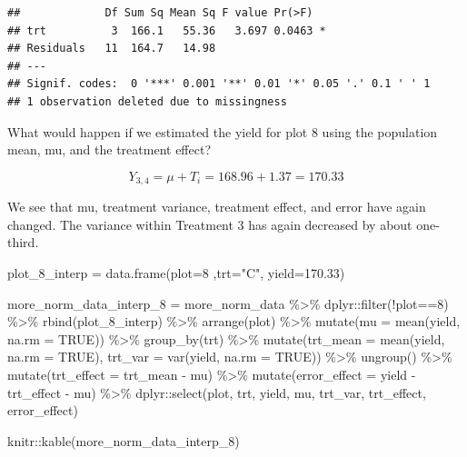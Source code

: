 \documentclass[
]{book}
\newenvironment{Shaded}{\begin{snugshade}}{\end{snugshade}}
\newcommand{\AttributeTok}[1]{\textcolor[rgb]{0.77,0.63,0.00}{#1}}
\newcommand{\ConstantTok}[1]{\textcolor[rgb]{0.00,0.00,0.00}{#1}}
\newcommand{\DecValTok}[1]{\textcolor[rgb]{0.00,0.00,0.81}{#1}}
\newcommand{\FloatTok}[1]{\textcolor[rgb]{0.00,0.00,0.81}{#1}}
\newcommand{\FunctionTok}[1]{\textcolor[rgb]{0.00,0.00,0.00}{#1}}
\newcommand{\NormalTok}[1]{#1}
\newcommand{\OtherTok}[1]{\textcolor[rgb]{0.56,0.35,0.01}{#1}}
\newcommand{\SpecialCharTok}[1]{\textcolor[rgb]{0.00,0.00,0.00}{#1}}
\newcommand{\StringTok}[1]{\textcolor[rgb]{0.31,0.60,0.02}{#1}}
\begin{document}
\begin{verbatim}
##             Df Sum Sq Mean Sq F value Pr(>F)  
## trt          3  166.1   55.36   3.697 0.0463 *
## Residuals   11  164.7   14.98                 
## ---
## Signif. codes:  0 '***' 0.001 '**' 0.01 '*' 0.05 '.' 0.1 ' ' 1
## 1 observation deleted due to missingness
\end{verbatim}

What would happen if we estimated the yield for plot 8 using the population mean, mu, and the treatment effect?

\[ Y_{3,4} = \mu + T_i = 168.96 + 1.37 = 170.33 \]

We see that mu, treatment variance, treatment effect, and error have again changed. The variance within Treatment 3 has again decreased by about one-third.

\begin{Shaded}
\begin{Highlighting}[]
\NormalTok{plot\_8\_interp }\OtherTok{=} \FunctionTok{data.frame}\NormalTok{(}\AttributeTok{plot=}\DecValTok{8}\NormalTok{ ,}\AttributeTok{trt=}\StringTok{"C"}\NormalTok{, }\AttributeTok{yield=}\FloatTok{170.33}\NormalTok{)}

\NormalTok{more\_norm\_data\_interp\_8 }\OtherTok{=}\NormalTok{ more\_norm\_data }\SpecialCharTok{\%\textgreater{}\%}
\NormalTok{  dplyr}\SpecialCharTok{::}\FunctionTok{filter}\NormalTok{(}\SpecialCharTok{!}\NormalTok{plot}\SpecialCharTok{==}\DecValTok{8}\NormalTok{) }\SpecialCharTok{\%\textgreater{}\%}
  \FunctionTok{rbind}\NormalTok{(plot\_8\_interp) }\SpecialCharTok{\%\textgreater{}\%}
  \FunctionTok{arrange}\NormalTok{(plot) }\SpecialCharTok{\%\textgreater{}\%}
  \FunctionTok{mutate}\NormalTok{(}\AttributeTok{mu =} \FunctionTok{mean}\NormalTok{(yield, }\AttributeTok{na.rm =} \ConstantTok{TRUE}\NormalTok{)) }\SpecialCharTok{\%\textgreater{}\%}
  \FunctionTok{group\_by}\NormalTok{(trt) }\SpecialCharTok{\%\textgreater{}\%}
  \FunctionTok{mutate}\NormalTok{(}\AttributeTok{trt\_mean =} \FunctionTok{mean}\NormalTok{(yield, }\AttributeTok{na.rm =} \ConstantTok{TRUE}\NormalTok{),}
         \AttributeTok{trt\_var =} \FunctionTok{var}\NormalTok{(yield, }\AttributeTok{na.rm =} \ConstantTok{TRUE}\NormalTok{)) }\SpecialCharTok{\%\textgreater{}\%}
  \FunctionTok{ungroup}\NormalTok{() }\SpecialCharTok{\%\textgreater{}\%}
  \FunctionTok{mutate}\NormalTok{(}\AttributeTok{trt\_effect =}\NormalTok{ trt\_mean }\SpecialCharTok{{-}}\NormalTok{ mu) }\SpecialCharTok{\%\textgreater{}\%}
  \FunctionTok{mutate}\NormalTok{(}\AttributeTok{error\_effect =}\NormalTok{ yield }\SpecialCharTok{{-}}\NormalTok{ trt\_effect }\SpecialCharTok{{-}}\NormalTok{ mu) }\SpecialCharTok{\%\textgreater{}\%}
\NormalTok{  dplyr}\SpecialCharTok{::}\FunctionTok{select}\NormalTok{(plot, trt, yield, mu, trt\_var, trt\_effect, error\_effect)}

\NormalTok{knitr}\SpecialCharTok{::}\FunctionTok{kable}\NormalTok{(more\_norm\_data\_interp\_8)}
\end{Highlighting}
\end{Shaded}
\end{document}
